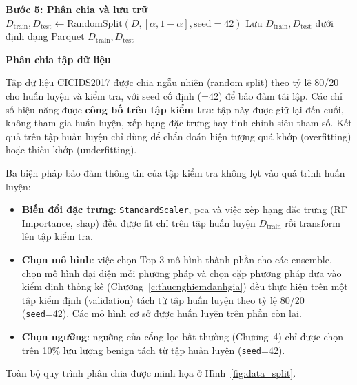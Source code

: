 \begin{algorithm}[htbp]
\begin{algorithmic}[1]
\State \textbf{Bước 5: Phân chia và lưu trữ}
\State $D_{\text{train}}, D_{\text{test}} \gets \text{RandomSplit}(D, [\alpha, 1 - \alpha], \text{seed} = 42)$
\State Lưu $D_{\text{train}}, D_{\text{test}}$ dưới định dạng Parquet
\State \Return $D_{\text{train}}, D_{\text{test}}$
\end{algorithmic}
\end{algorithm}

\textbf{Phân chia tập dữ liệu}

Tập dữ liệu CICIDS2017 được chia ngẫu nhiên (random split) theo tỷ lệ 80/20 cho huấn luyện và kiểm tra, với seed cố định (=42) để bảo đảm tái lập. Các chỉ số hiệu năng được \textbf{công bố trên tập kiểm tra}: tập này được giữ lại đến cuối, không tham gia huấn luyện, xếp hạng đặc trưng hay tinh chỉnh siêu tham số. Kết quả trên tập huấn luyện chỉ dùng để chẩn đoán hiện tượng quá khớp (overfitting) hoặc thiếu khớp (underfitting).

Ba biện pháp bảo đảm thông tin của tập kiểm tra không lọt vào quá trình huấn luyện:
\begin{itemize}
    \item \textbf{Biến đổi đặc trưng}: \texttt{StandardScaler}, \ac{pca} và việc xếp hạng đặc trưng (RF Importance, \ac{shap}) đều được fit chỉ trên tập huấn luyện $D_{\text{train}}$ rồi transform lên tập kiểm tra.
    \item \textbf{Chọn mô hình}: việc chọn Top-3 mô hình thành phần cho các ensemble, chọn mô hình đại diện mỗi phương pháp và chọn cặp phương pháp đưa vào kiểm định thống kê (Chương~\ref{c:thucnghiemdanhgia}) đều thực hiện trên một tập kiểm định (validation) tách từ tập huấn luyện theo tỷ lệ 80/20 (\texttt{seed}=42). Các mô hình cơ sở được huấn luyện trên phần còn lại.
    \item \textbf{Chọn ngưỡng}: ngưỡng của cổng lọc bất thường (Chương~4) chỉ được chọn trên 10\% lưu lượng benign tách từ tập huấn luyện (\texttt{seed}=42).
\end{itemize}

Toàn bộ quy trình phân chia được minh họa ở Hình~\ref{fig:data_split}.

